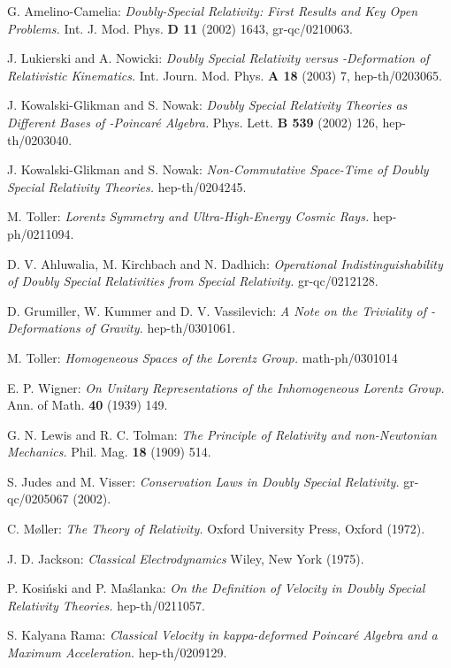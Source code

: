 \documentclass[a4paper,12pt]{article}
\begin{document}
\begin{thebibliography}{999}
 G. Amelino-Camelia:
{\it Doubly-Special Relativity: First Results and Key Open Problems.}
Int. J. Mod. Phys. {\bf D 11} (2002) 1643, gr-qc/0210063.

 J. Lukierski and A. Nowicki:
{\it Doubly Special Relativity versus \myHighlight{$\kappa$}\coordHE{}-Deformation of Relativistic Kinematics.}
Int. Journ. Mod. Phys. {\bf A 18} (2003) 7, hep-th/0203065.

 J. Kowalski-Glikman and S. Nowak:
{\it Doubly Special Relativity Theories as Different Bases of \myHighlight{$\kappa$}\coordHE{}-Poincar\'e Algebra.}
Phys. Lett. {\bf B 539} (2002) 126, hep-th/0203040.

 J. Kowalski-Glikman and S. Nowak:
{\it Non-Commutative Space-Time of Doubly Special Relativity Theories.}
hep-th/0204245.

 M. Toller:
{\it Lorentz Symmetry and Ultra-High-Energy Cosmic Rays.}
hep-ph/0211094.

 D. V. Ahluwalia, M. Kirchbach and N. Dadhich:
{\it Operational Indistinguishability of Doubly Special Relativities from Special Relativity.}
gr-qc/0212128.

 D. Grumiller, W. Kummer and D. V. Vassilevich:
{\it A Note on the Triviality of \myHighlight{$\kappa$}\coordHE{}-Deformations of Gravity.}
hep-th/0301061.

 M. Toller:
{\it Homogeneous Spaces of the Lorentz Group.}
math-ph/0301014

  E. P. Wigner:
{\it On Unitary Representations of the Inhomogeneous Lorentz Group.}
Ann. of Math. {\bf 40} (1939) 149.

 G. N. Lewis and R. C. Tolman:
{\it The Principle of Relativity and non-Newtonian Mechanics.}
Phil. Mag. {\bf 18} (1909) 514.

  S. Judes and M. Visser:
{\it Conservation Laws in Doubly Special Relativity.}
gr-qc/0205067 (2002).

 C. M\o ller:
{\it The Theory of Relativity.}
Oxford University Press, Oxford (1972).

 J. D. Jackson:
{\it Classical Electrodynamics}
Wiley, New York (1975).

 P. Kosi\'nski and P. Ma\'slanka:
{\it On the Definition of Velocity in Doubly Special Relativity Theories.}
hep-th/0211057.

 S. Kalyana Rama:
{\it Classical Velocity in kappa-deformed Poincar\'e Algebra and a Maximum Acceleration.}
hep-th/0209129.


\end{thebibliography}
\end{document}
